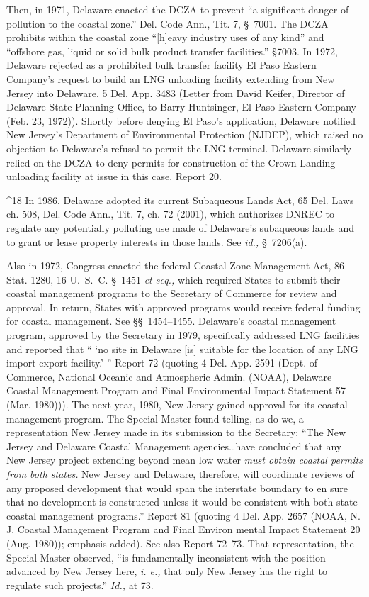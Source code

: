 {{  Then, in 1971, Delaware enacted the DCZA to prevent ``a significant
danger of pollution to the coastal zone.'' Del. Code Ann., Tit.
7, \S~7001. The DCZA prohibits within the coastal zone ``[h]eavy
industry uses of any kind'' and ``offshore gas, liquid or solid bulk
product transfer facilities.'' \S7003. In 1972, Delaware rejected
as a prohibited bulk transfer facility El Paso Eastern Company's
request to build an LNG unloading facility extending from New Jersey
into \newpage  Delaware. 5 Del. App. 3483 (Letter from David Keifer,
Director of Delaware State Planning Office, to Barry Huntsinger, El
Paso Eastern Company (Feb. 23, 1972)). Shortly before denying El
Paso's application, Delaware notified New Jersey's Department
of Environmental Protection (NJDEP), which raised no objection to
Delaware's refusal to permit the LNG terminal. \footnotemark[19] Delaware
similarly relied on the DCZA to deny permits for construction of the
Crown Landing unloading facility at issue in this case. Report 20.

^18 In 1986, Delaware adopted its current Subaqueous Lands Act, 65
Del. Laws ch. 508, Del. Code Ann., Tit. 7, ch. 72 (2001), which
authorizes DNREC to regulate any potentially polluting use made of
Delaware's subaqueous lands and to grant or lease property interests
in those lands. See \emph{id.,} \S~7206(a).

  Also in 1972, Congress enacted the federal Coastal Zone Management
Act, 86 Stat. 1280, 16 U.~S.~C. \S~1451 \emph{et seq.,} which required
States to submit their coastal management programs to the Secretary
of Commerce for review and approval. In return, States with approved
programs would receive federal funding for coastal management. See
\S\S~1454--1455. Delaware's coastal management program, approved
by the Secretary in 1979, specifically addressed LNG facilities and
reported that `` ‘no site in Delaware [is] suitable for the location
of any LNG import-export facility.' '' Report 72 (quoting 4 Del.
App. 2591 (Dept. of Commerce, National Oceanic and Atmospheric Admin.
(NOAA), Delaware Coastal Management Program and Final Environmental
Impact Statement 57 (Mar. 1980))). The next year, 1980, New Jersey
gained approval for its coastal management program. The Special Master
found telling, as do we, a representation New Jersey made in its
submission to the Secretary: ``The New Jersey and Delaware Coastal
Management agencies\dots have concluded that any New Jersey project
extending beyond mean low water \emph{must obtain coastal permits from both
states.} New Jersey and Delaware, therefore, will coordinate reviews
of any proposed devel\newpage opment that would span the interstate
boundary to en sure that no development is constructed unless it would
be consistent with both state coastal management programs.'' Report
81 (quoting 4 Del. App. 2657 (NOAA, N. J. Coastal Management Program and
Final Environ mental Impact Statement 20 (Aug. 1980)); emphasis added).
See also Report 72--73. That representation, the Special Master
observed, ``is fundamentally inconsistent with the position advanced
by New Jersey here, \emph{i. e.,} that only New Jersey has the right to
regulate such projects.'' \emph{Id.,} at 73.

}}
